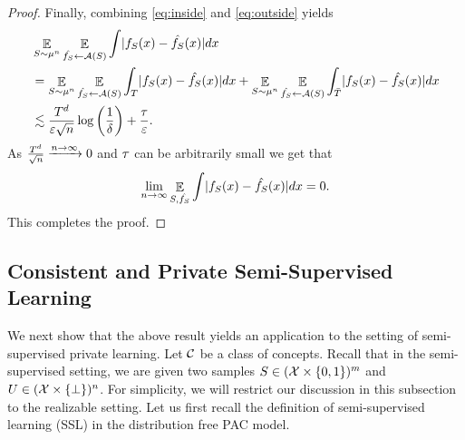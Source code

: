 \documentclass[12pt,a4paper,oneside,onecolumn]{book}
\begin{document}
\begin{proof}
Finally, combining \eqref{eq:inside} and \eqref{eq:outside} yields
\begin{align*}
&\mathop{\mathbb{E}}_{S\sim\mu^n}
\mathop{\mathbb{E}}_{\hat{f_S}\leftarrow\mathcal{A}(S)}
\int \lvert f_S(x) - \hat{f_S}(x)\rvert dx \\
&= 
\mathop{\mathbb{E}}_{S\sim\mu^n}
\mathop{\mathbb{E}}_{\hat{f_S}\leftarrow\mathcal{A}(S)}
\int_{T} \lvert f_S(x) - \hat{f_S}(x)\rvert dx 
+
\mathop{\mathbb{E}}_{S\sim\mu^n}
\mathop{\mathbb{E}}_{\hat{f_S}\leftarrow\mathcal{A}(S)}
\int_{\bar{T}} \lvert f_S(x) - \hat{f_S}(x)\rvert dx \\
&\lesssim
\frac{T^d}{\varepsilon\sqrt{n}}
\log\left(\frac{1}{\delta}\right)
+
\frac{\tau}{\varepsilon}.
\end{align*}
As $\frac{T^d}{\sqrt{n}} \xrightarrow[]{n\to\infty} 0$ 
and $\tau$ can be arbitrarily small we get that
$$
  \lim_{n\to\infty}
    \mathop{\mathbb{E}}_{S,\hat{f_S}}
    \int \lvert f_S(x) - \hat{f_S}(x)\rvert dx = 0.
$$
This completes the proof.
\end{proof}


\subsection{Consistent and Private Semi-Supervised Learning}

We next show that the above result yields an application to the setting of semi-supervised private learning. 
Let $\mathcal{C}$ be a class of concepts. 
Recall that in the semi-supervised setting, we are given two samples 
$S \in (\mathcal{X} \times \{0,1\})^m$ and 
$U \in (\mathcal{X} \times \{\perp\})^{n}$. For simplicity, we will restrict our discussion in this subsection to the realizable setting. Let us first recall the definition of semi-supervised learning (SSL) in the distribution free PAC model.

%









\end{document}

